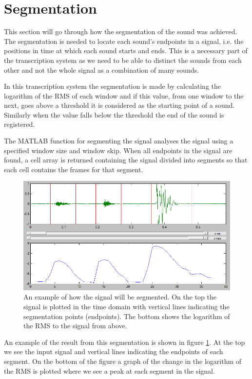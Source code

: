 \section{Segmentation}
This section will go through how the segmentation of the sound was achieved. The segmentation is needed to locate each sound's endpoints in a signal, i.e. the positions in time at which each sound starts and ends. This is a necessary part of the transcription system as we need to be able to distinct the sounds from each other and not the whole signal as a combination of many sounds.

In this transcription system the segmentation is made by calculating the logarithm of the RMS of each window and if this value, from one window to the next, goes above a threshold it is considered as the starting point of a sound. Similarly when the value falls below the threshold the end of the sound is registered.

The MATLAB function for segmenting the signal analyses the signal using a specified window size and window skip. When all endpoints in the signal are found, a cell array is returned containing the signal divided into segments so that each cell contains the frames for that segment.

\begin{figure}[h]
	\begin{center}
		\includegraphics[scale =  0.4]{fig/SegmentationPic.png}
		\caption{An example of how the signal will be segmented. On the top the signal is plotted in the time domain with vertical lines indicating the segmentation points (endpoints). The bottom shows the logarithm of the RMS to the signal from above.}
		\label{SegmentationPic}
	\end{center}
\end{figure}

An example of the result from this segmentation is shown in figure \ref{SegmentationPic}. At the top we see the input signal and vertical lines indicating the endpoints of each segment. On the bottom of the figure a graph of the change in the logarithm of the RMS is plotted where we see a peak at each segment in the signal.